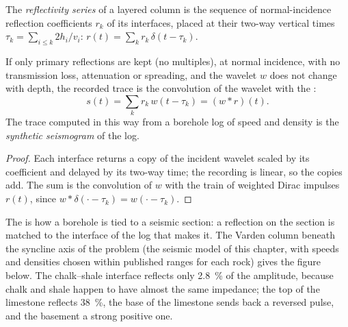 \begin{definition}\label{def:b3:exploration-seismology:synthetic}
The \emph{reflectivity series} of a layered column is
the sequence of normal-incidence reflection coefficients $r_k$ of its interfaces,
placed at their two-way vertical times $\tau_k = \sum_{i \le k} 2h_i/v_i$:
$r(t) = \sum_k r_k\,\delta(t - \tau_k)$.
\end{definition}

\begin{proposition}\label{prop:b3:exploration-seismology:synthetic}
If only primary reflections are kept (no multiples), at normal incidence, with
no transmission loss, attenuation or spreading, and the wavelet $w$ does not
change with depth, the recorded trace is the convolution of the wavelet with the
:
\[
  s(t) = \sum_k r_k\,w(t - \tau_k) = (w*r)(t) .
\]
The trace computed in this way from a borehole log of speed and density is the
\emph{synthetic seismogram} of the log.
\end{proposition}

\begin{proof}
Each interface returns a copy of the incident wavelet scaled by its coefficient
and delayed by its two-way time; the recording is linear, so the copies add.
The sum is the convolution of $w$ with the train of weighted Dirac impulses
$r(t)$, since $w*\delta(\cdot - \tau_k) = w(\cdot - \tau_k)$.
\end{proof}

The  is how a borehole is tied to a seismic section: a
reflection on the section is matched to the interface of the log that makes it.
The Varden column beneath the syncline axis of the problem (the seismic model of
this chapter, with speeds and densities chosen within published ranges for
each rock)
gives the figure below. The chalk--shale interface reflects only
\qty{2.8}{\percent} of the amplitude, because chalk and shale happen to have
almost the same impedance; the top of the limestone reflects \qty{38}{\percent},
the base of the limestone sends back a reversed pulse, and the basement a strong
positive one.

